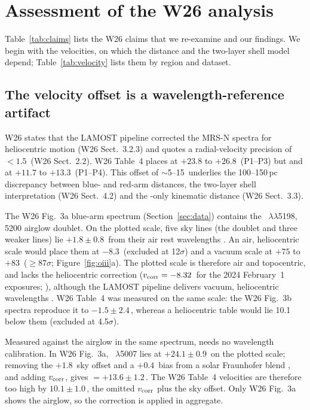 \section{Assessment of the W26 analysis}\label{sec:assess}

Table~\ref{tab:claims} lists the W26 claims that we re-examine and our findings. We begin with the velocities, on which the distance and the two-layer shell model depend; Table~\ref{tab:velocity} lists them by region and dataset.

\subsection{The \texorpdfstring{\Oiii{}}{[O III]} velocity offset is a wavelength-reference artifact}\label{sec:oiii}

W26 states that the LAMOST pipeline corrected the MRS-N spectra for heliocentric motion (W26 Sect.~3.2.3) and quotes a radial-velocity precision of $<1.5$\,\kms{} (W26 Sect.~2.2). W26 Table~4 places \Oiii{} at $+23.8$ to $+26.8$\,\kms{} (P1--P3) but \Nii{} and \Sii{} at $+11.7$ to $+13.3$\,\kms{} (P1--P4). This offset of $\sim$5--15\,\kms{} underlies the 100--150\,pc discrepancy between blue- and red-arm distances, the two-layer shell interpretation (W26 Sect.~4.2) and the \Oiii-only kinematic distance (W26 Sect.~3.3).

The W26 Fig.~3a blue-arm spectrum (Section~\ref{sec:data}) contains the \Ni~$\lambda\lambda$5198, 5200 airglow doublet. On the plotted scale, five sky lines (the doublet and three weaker lines) lie $+1.8\pm0.8$\,\kms{} from their air rest wavelengths \citep{Hanuschik2003,Kramida2024}. An air, heliocentric scale would place them at $-8.3$\,\kms{} (excluded at 12$\sigma$) and a vacuum scale at $+75$ to $+83$\,\kms{} ($\geq87\sigma$; Figure~\ref{fig:oiii}a). The plotted scale is therefore air and topocentric, and lacks the heliocentric correction ($v_{\rm corr}=-8.32$\,\kms{} for the 2024 February~1 exposures; \citealt{Astropy2022}), although the LAMOST pipeline delivers vacuum, heliocentric wavelengths \citep{Luo2015,Ren2021}. W26 Table~4 was measured on the same scale: the W26 Fig.~3b spectra reproduce it to $-1.5\pm2.4$\,\kms, whereas a heliocentric table would lie 10.1\,\kms{} below them (excluded at 4.5$\sigma$).

Measured against the airglow in the same spectrum, \Oiii{} needs no wavelength calibration. In W26 Fig.~3a, \Oiii~$\lambda$5007 lies at $+24.1\pm0.9$\,\kms{} on the plotted scale; removing the $+1.8$\,\kms{} sky offset and a $+0.4$\,\kms{} bias from a solar Fraunhofer blend \citep{Kurucz2005}, and adding $v_{\rm corr}$, gives \vhel{} $=+13.6\pm1.2$\,\kms. The W26 Table~4 \Oiii{} velocities are therefore too high by $10.1\pm1.0$\,\kms, the omitted $v_{\rm corr}$ plus the sky offset. Only W26 Fig.~3a shows the airglow, so the correction is applied in aggregate.

